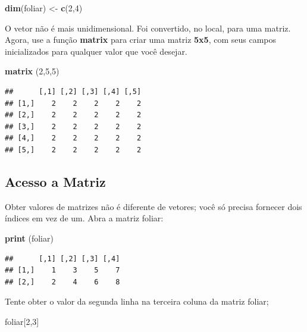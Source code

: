 \documentclass[
]{book}
\newenvironment{Shaded}{\begin{snugshade}}{\end{snugshade}}
\newcommand{\DecValTok}[1]{\textcolor[rgb]{0.00,0.00,0.81}{#1}}
\newcommand{\KeywordTok}[1]{\textcolor[rgb]{0.13,0.29,0.53}{\textbf{#1}}}
\newcommand{\NormalTok}[1]{#1}
\newcommand{\StringTok}[1]{\textcolor[rgb]{0.31,0.60,0.02}{#1}}
\begin{document}
\begin{Shaded}
\begin{Highlighting}[]
\KeywordTok{dim}\NormalTok{(foliar) <-}\StringTok{ }\KeywordTok{c}\NormalTok{(}\DecValTok{2}\NormalTok{,}\DecValTok{4}\NormalTok{)}
\end{Highlighting}
\end{Shaded}

O vetor não é mais unidimensional. Foi convertido, no local, para uma matriz.
Agora, use a função \textbf{matrix} para criar uma matriz \textbf{5x5}, com seus campos inicializados para qualquer valor que você desejar.

\begin{Shaded}
\begin{Highlighting}[]
\KeywordTok{matrix}\NormalTok{ (}\DecValTok{2}\NormalTok{,}\DecValTok{5}\NormalTok{,}\DecValTok{5}\NormalTok{)}
\end{Highlighting}
\end{Shaded}

\begin{verbatim}
##      [,1] [,2] [,3] [,4] [,5]
## [1,]    2    2    2    2    2
## [2,]    2    2    2    2    2
## [3,]    2    2    2    2    2
## [4,]    2    2    2    2    2
## [5,]    2    2    2    2    2
\end{verbatim}

\hypertarget{acesso-a-matriz}{%
\subsection{Acesso a Matriz}\label{acesso-a-matriz}}

Obter valores de matrizes não é diferente de vetores; você só precisa fornecer dois índices em vez de um. Abra a matriz foliar:

\begin{Shaded}
\begin{Highlighting}[]
\KeywordTok{print}\NormalTok{ (foliar)}
\end{Highlighting}
\end{Shaded}

\begin{verbatim}
##      [,1] [,2] [,3] [,4]
## [1,]    1    3    5    7
## [2,]    2    4    6    8
\end{verbatim}

Tente obter o valor da segunda linha na terceira coluna da matriz foliar;

\begin{Shaded}
\begin{Highlighting}[]
\NormalTok{foliar[}\DecValTok{2}\NormalTok{,}\DecValTok{3}\NormalTok{]}
\end{Highlighting}
\end{Shaded}
\end{document}
